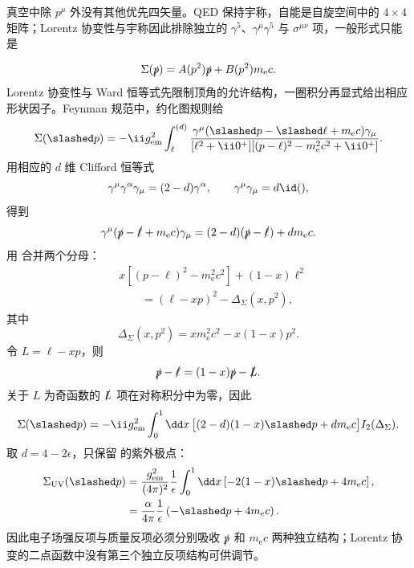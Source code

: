 \begin{derivation}[电子自能的结构与紫外项]
真空中除 $p^\mu$ 外没有其他优先四矢量。QED 保持宇称，自能是自旋空间中的 $4\times4$ 矩阵；Lorentz 协变性与宇称因此排除独立的 $\gamma^5$、$\gamma^\mu\gamma^5$ 与 $\sigma^{\mu\nu}$ 项，一般形式只能是

\begin{equation*}
 {
 \Sigma(\slashed p)
 =A(p^2)\slashed p+B(p^2)m_{\mathrm e} c.}
 \end{equation*}
Lorentz 协变性与 Ward 恒等式先限制顶角的允许结构，一圈积分再显式给出相应形状因子。Feynman 规范中，约化图规则给
\begin{equation*}
 \Sigma(\slashed p)
 =-\ii g_{\rm em}^2
 \int_{\ell}^{(d)}
 \frac{\gamma^\mu(\slashed p-\slashed\ell+m_{\mathrm e} c)\gamma_\mu}
 {[\ell^2+\ii0^+][(p-\ell)^2-m_{\mathrm e}^2c^2+\ii0^+]}.
 \end{equation*}
用相应的 $d$ 维 Clifford 恒等式
\begin{equation*}
 \gamma^\mu\gamma^\alpha\gamma_\mu=(2-d)\gamma^\alpha,
 \qquad
 \gamma^\mu\gamma_\mu=d\id(),
\end{equation*}
得到
\begin{equation*}
 \gamma^\mu(\slashed p-\slashed\ell+m_{\mathrm e} c)\gamma_\mu
 =(2-d)(\slashed p-\slashed\ell)+dm_{\mathrm e} c.
 \end{equation*}
用  合并两个分母：
\begin{align*}
 &x[(p-\ell)^2-m_{\mathrm e}^2c^2]+(1-x)\ell^2\\
 &\qquad=(\ell-xp)^2-\Delta_\Sigma(x,p^2),
\end{align*}
其中
\begin{equation*}
 {
 \Delta_\Sigma(x,p^2)
 =xm_{\mathrm e}^2c^2-x(1-x)p^2.}
 \end{equation*}
令 $L=\ell-xp$，则
\begin{equation*}
 \slashed p-\slashed\ell=(1-x)\slashed p-\slashed L.
\end{equation*}
关于 $L$ 为奇函数的 $\slashed L$ 项在对称积分中为零，因此
\begin{align*}
 \Sigma(\slashed p)
 =-\ii g_{\rm em}^2
 \int_0^1\dd x\,
 \bigl[(2-d)(1-x)\slashed p+dm_{\mathrm e} c\bigr]
 I_2(\Delta_\Sigma).
 \end{align*}
取 $d=4-2\epsilon$，只保留  的紫外极点：
\begin{align*}
 \Sigma_{\rm UV}(\slashed p)
 &=\frac{g_{\rm em}^2}{(4\pi)^2}\frac1\epsilon
 \int_0^1\dd x
 \left[-2(1-x)\slashed p+4m_{\mathrm e} c\right],\\
 &=\frac{\alpha}{4\pi}\frac1\epsilon
 \left(-\slashed p+4m_{\mathrm e} c\right).
 \end{align*}
因此电子场强反项与质量反项必须分别吸收 $\slashed p$ 和 $m_{\mathrm e} c$ 两种独立结构；Lorentz 协变的二点函数中没有第三个独立反项结构可供调节。
\end{derivation}

